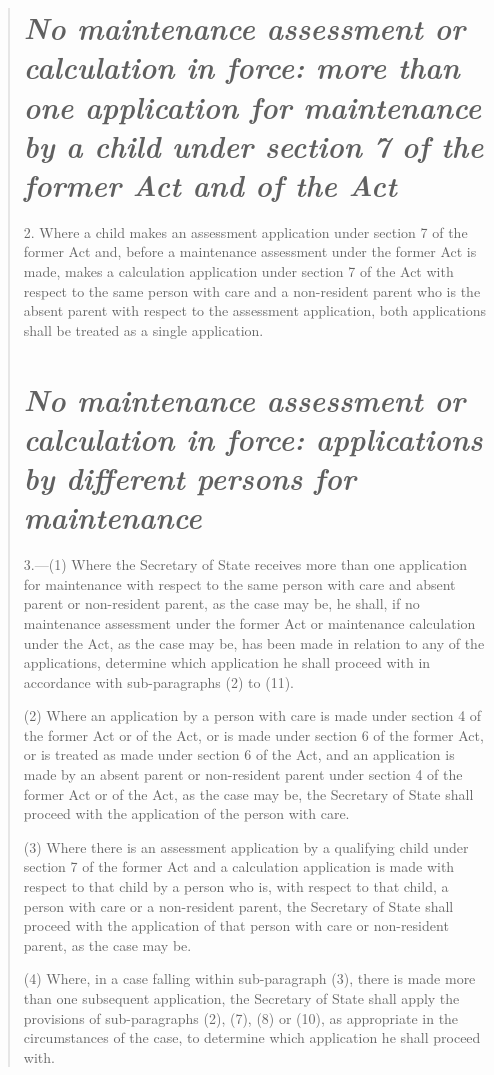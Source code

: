 \documentclass[12pt,a4paper]{article}
\begin{document}
\begin{quotation}
\section*{\itshape No maintenance assessment or calculation in force: more than one application for maintenance by a child under section 7 of the former Act and of the Act}

2.  Where a child makes an assessment application under section 7 of the former Act and, before a maintenance assessment under the former Act is made, makes a calculation application under section 7 of the Act with respect to the same person with care and a non-resident parent who is the absent parent with respect to the assessment application, both applications shall be treated as a single application.

\section*{\itshape No maintenance assessment or calculation in force: applications by different persons for maintenance}

3.---(1)  Where the Secretary of State receives more than one application for maintenance with respect to the same person with care and absent parent or non-resident parent, as the case may be, he shall, if no maintenance assessment under the former Act or maintenance calculation under the Act, as the case may be, has been made in relation to any of the applications, determine which application he shall proceed with in accordance with sub-paragraphs (2) to (11).

(2) Where an application by a person with care is made under section 4 of the former Act or of the Act, or is made under section 6 of the former Act, or is treated as made under section 6 of the Act, and an application is made by an absent parent or non-resident parent under section 4 of the former Act or of the Act, as the case may be, the Secretary of State shall proceed with the application of the person with care.

(3) Where there is an assessment application by a qualifying child under section 7 of the former Act and a calculation application is made with respect to that child by a person who is, with respect to that child, a person with care or a non-resident parent, the Secretary of State shall proceed with the application of that person with care or non-resident parent, as the case may be.

(4) Where, in a case falling within sub-paragraph (3), there is made more than one subsequent application, the Secretary of State shall apply the provisions of sub-paragraphs (2), (7), (8) or (10), as appropriate in the circumstances of the case, to determine which application he shall proceed with.


\end{quotation}
\end{document}
